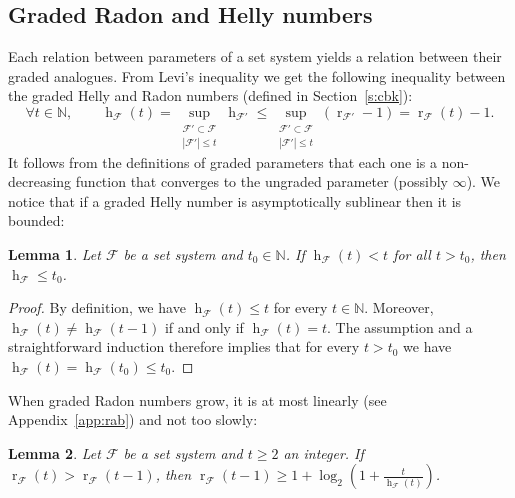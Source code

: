 \documentclass[11pt]{article}
\newcommand{\N}{\mathbb{N}}
\newcommand{\F}{\mathcal{F}}
\DeclareMathOperator{\h}{h}
\DeclareMathOperator{\rad}{r}
\newcommand{\pth}[1]{\left(#1\right)}
\newtheorem{lemma}{Lemma}[section]
\begin{document}
\subsection{Graded Radon and Helly numbers}\label{s:graded1}
%
%
Each relation between parameters of a set system yields a relation between their graded analogues. From Levi's inequality we get the following inequality between the graded Helly and Radon numbers (defined in Section~\ref{s:cbk}):
%
\begin{equation}\label{eq:gradedhr}
  \forall t \in \N, \qquad \h_\F(t) =  \sup\limits_{\substack{\F'\subset \F \\ |\F'|\leq t}} \h_{\F'} \le \sup\limits_{\substack{\F'\subset \F \\ |\F'|\leq t}} \pth{\rad_{\F'}-1} = \rad_\F(t) - 1. 
\end{equation}
%
It follows from the definitions of graded parameters that each one is a non-decreasing function that converges to the ungraded parameter (possibly $\infty$). We notice that if a graded Helly number is asymptotically sublinear then it is bounded: 
%
\begin{lemma}\label{l:hellygrowth}
  Let $\F$ be a set system and $t_0 \in \N$. If $\h_\F(t) < t$ for all $t>t_0$, then $\h_\F \leq t_0$.
\end{lemma}
\begin{proof}
  By definition, we have $\h_\F(t) \le t$ for every $t \in \N$. Moreover, $\h_\F(t) \neq \h_\F(t-1)$ if and only if $\h_\F(t) = t$. The assumption and a straightforward induction therefore implies that for every $t>t_0$ we have $\h_\F(t) = \h_\F(t_0) \le t_0$.
\end{proof}
%
\noindent
When graded Radon numbers grow, it is at most linearly (see Appendix~\ref{app:rab}) and not too slowly:
%
\begin{lemma}\label{l:radongrowth}
  Let $\F$ be a set system and $t\ge 2$ an integer. If $\rad_\F(t) > \rad_\F(t-1)$, then $\rad_\F(t-1) \ge 1+\log_2\pth{1+\frac{t}{\h_\F(t)}}$.%
\end{lemma}
\end{document}
